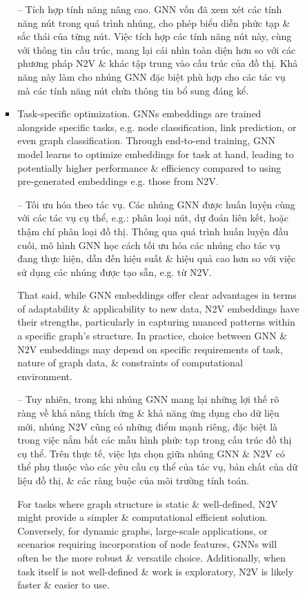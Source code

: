 \documentclass{article}
\begin{document}
\begin{itemize}
\begin{itemize}
\begin{itemize}
\begin{itemize}
               -- {\sf Tích hợp tính năng nâng cao.} GNN vốn đã xem xét các tính năng nút trong quá trình nhúng, cho phép biểu diễn phức tạp \& sắc thái của từng nút. Việc tích hợp các tính năng nút này, cùng với thông tin cấu trúc, mang lại cái nhìn toàn diện hơn so với các phương pháp N2V \& khác tập trung vào cấu trúc của đồ thị. Khả năng này làm cho nhúng GNN đặc biệt phù hợp cho các tác vụ mà các tính năng nút chứa thông tin bổ sung đáng kể.
               \item {\sf Task-specific optimization.} GNNs embeddings are trained alongside specific tasks, e.g. node classification, link prediction, or even graph classification. Through end-to-end training, GNN model learns to optimize embeddings for task at hand, leading to potentially higher performance \& efficiency compared to using pre-generated embeddings e.g. those from N2V.

               -- {\sf Tối ưu hóa theo tác vụ.} Các nhúng GNN được huấn luyện cùng với các tác vụ cụ thể, e.g.: phân loại nút, dự đoán liên kết, hoặc thậm chí phân loại đồ thị. Thông qua quá trình huấn luyện đầu cuối, mô hình GNN học cách tối ưu hóa các nhúng cho tác vụ đang thực hiện, dẫn đến hiệu suất \& hiệu quả cao hơn so với việc sử dụng các nhúng được tạo sẵn, e.g. từ N2V.

               That said, while GNN embeddings offer clear advantages in terms of adaptability \& applicability to new data, N2V embeddings have their strengths, particularly in capturing nuanced patterns within a specific graph's structure. In practice, choice between GNN \& N2V embeddings may depend on specific requirements of task, nature of graph data, \& constraints of computational environment.

               -- Tuy nhiên, trong khi nhúng GNN mang lại những lợi thế rõ ràng về khả năng thích ứng \& khả năng ứng dụng cho dữ liệu mới, nhúng N2V cũng có những điểm mạnh riêng, đặc biệt là trong việc nắm bắt các mẫu hình phức tạp trong cấu trúc đồ thị cụ thể. Trên thực tế, việc lựa chọn giữa nhúng GNN \& N2V có thể phụ thuộc vào các yêu cầu cụ thể của tác vụ, bản chất của dữ liệu đồ thị, \& các ràng buộc của môi trường tính toán.

               For tasks where graph structure is static \& well-defined, N2V might provide a simpler \& computational efficient solution. Conversely, for dynamic graphs, large-scale applications, or scenarios requiring incorporation of node features, GNNs will often be the more robust \& versatile choice. Additionally, when task itself is not well-defined \& work is exploratory, N2V is likely faster \& easier to use.


\end{itemize}
\end{itemize}
\end{itemize}
\end{itemize}
\end{document}
